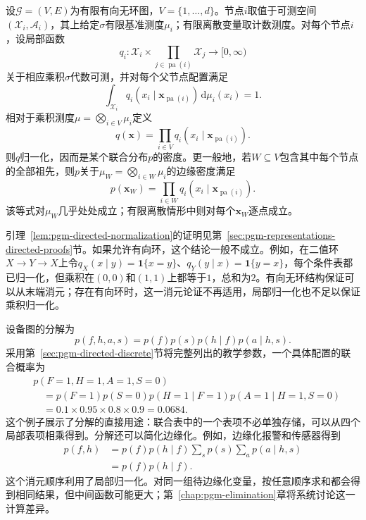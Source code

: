 \begin{lemma}[局部归一化与祖先边缘化]
  \label{lem:pgm-directed-normalization}
  设$\mathcal{G}=(V,E)$为有限有向无环图，$V=\{1,\ldots,d\}$。节点$i$取值于可测空间$(\mathcal{X}_i,\mathcal{A}_i)$，其上给定$\sigma$有限基准测度$\mu_i$；有限离散变量取计数测度。对每个节点$i$，设局部函数
  \[
    q_i:
    \mathcal{X}_i\times
    \prod_{j\in\operatorname{pa}(i)}\mathcal{X}_j
    \longrightarrow[0,\infty)
  \]
  关于相应乘积$\sigma$代数可测，并对每个父节点配置满足
  \[
    \int_{\mathcal{X}_i}
    q_i(x_i\mid\bm{x}_{\operatorname{pa}(i)})\,\mathrm{d}\mu_i(x_i)=1.
  \]
  相对于乘积测度$\mu=\bigotimes_{i\in V}\mu_i$定义
  \[
    q(\bm{x})=\prod_{i\in V}
    q_i(x_i\mid\bm{x}_{\operatorname{pa}(i)}).
  \]
  则$q$归一化，因而是某个联合分布$p$的密度。更一般地，若$W\subseteq V$包含其中每个节点的全部祖先，则$p$关于$\mu_W=\bigotimes_{i\in W}\mu_i$的边缘密度满足
  \begin{equation}
    p(\bm{x}_W)=
    \prod_{i\in W}q_i(x_i\mid\bm{x}_{\operatorname{pa}(i)}).
    \label{eq:pgm-directed-ancestral-marginal}
  \end{equation}
  该等式对$\mu_W$几乎处处成立；有限离散情形中则对每个$\bm{x}_W$逐点成立。
\end{lemma}

引理~\ref{lem:pgm-directed-normalization}的证明见第~\ref{sec:pgm-representations-directed-proofs}节。如果允许有向环，这个结论一般不成立。例如，在二值环$X\to Y\to X$上令$q_X(x\mid y)=\mathbf{1}\{x=y\}$、$q_Y(y\mid x)=\mathbf{1}\{y=x\}$，每个条件表都已归一化，但乘积在$(0,0)$和$(1,1)$上都等于$1$，总和为$2$。有向无环结构保证可以从末端消元；存在有向环时，这一消元论证不再适用，局部归一化也不足以保证乘积归一化。

设备图的分解为
\begin{equation}
  p(f,h,a,s)=p(f)p(s)p(h\mid f)p(a\mid h,s).
  \label{eq:pgm-directed-device-factor}
\end{equation}
采用第~\ref{sec:pgm-directed-discrete}节将完整列出的教学参数，一个具体配置的联合概率为
\begin{equation}
  \begin{aligned}
    &p(F=1,H=1,A=1,S=0)\\
    &\quad=p(F=1)p(S=0)p(H=1\mid F=1)
      p(A=1\mid H=1,S=0)\\
    &\quad=0.1\times0.95\times0.8\times0.9
      =0.0684.
  \end{aligned}
  \label{eq:pgm-directed-device-configuration}
\end{equation}
这个例子展示了分解的直接用途：联合表中的一个表项不必单独存储，可以从四个局部表项相乘得到。分解还可以简化边缘化。例如，边缘化报警和传感器得到
\[
  \begin{aligned}
    p(f,h)
    &=p(f)p(h\mid f)
      \sum_s p(s)\sum_a p(a\mid h,s)\\
    &=p(f)p(h\mid f).
  \end{aligned}
\]
这个消元顺序利用了局部归一化。对同一组待边缘化变量，按任意顺序求和都会得到相同结果，但中间函数可能更大；第~\ref{chap:pgm-elimination}章将系统讨论这一计算差异。

